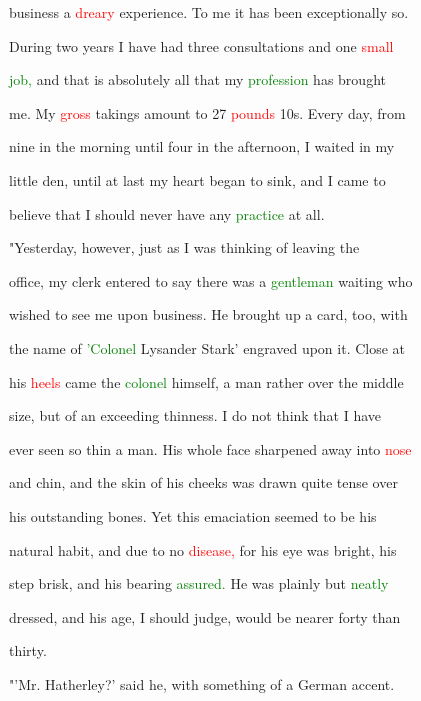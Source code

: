  business a \textcolor{red}{dreary} experience. To me it has been exceptionally so.

 During two years I have had three consultations and one \textcolor{red}{small}

 \textcolor{green}{job,} and that is absolutely all that my \textcolor{green}{profession} has brought

 me. My \textcolor{red}{gross} takings amount to 27 \textcolor{red}{pounds} 10s. Every day, from

 nine in the morning until four in the afternoon, I \textcolor{BurntOrange}{waited} in my

 little den, until at last my heart began to sink, and I came to

 believe that I should never have any \textcolor{green}{practice} at all.



 "Yesterday, however, just as I was thinking of \textcolor{BurntOrange}{leaving} the

 office, my clerk entered to say there was a \textcolor{green}{gentleman} \textcolor{BurntOrange}{waiting} who

 wished to see me upon business. He brought up a card, too, with

 the name of \textcolor{green}{'Colonel} Lysander \textcolor{BurntOrange}{Stark'} engraved upon it. Close at

 his \textcolor{red}{heels} came the \textcolor{green}{colonel} himself, a man rather over the middle

 size, but of an \textcolor{BurntOrange}{exceeding} thinness. I do not think that I have

 ever seen so thin a man. His whole face \textcolor{BurntOrange}{sharpened} away into \textcolor{red}{nose}

 and chin, and the skin of his cheeks was drawn quite tense over

 his \textcolor{BurntOrange}{outstanding} bones. Yet this emaciation seemed to be his

 natural habit, and due to no \textcolor{red}{disease,} for his eye was bright, his

 step brisk, and his bearing \textcolor{green}{assured.} He was plainly but \textcolor{green}{neatly}

 dressed, and his age, I should judge, would be nearer forty than

 thirty.



 "'Mr. Hatherley?' said he, with something of a German accent.

